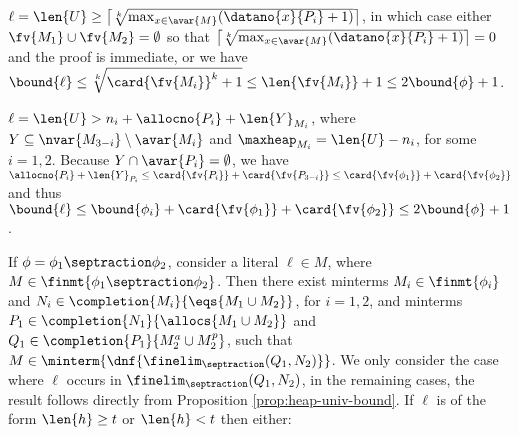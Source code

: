 {\begin{compactitem}
\begin{compactitem}
\begin{compactitem}
         \item $\ell = \len{U} \geq \left\lceil\sqrt[k]{\max_{x \in
             \avar{M}}(\datano{x}{P_i}+1)}\right\rceil$, in which case
           either $\fv{M_1} \cup \fv{M_2} = \emptyset$ so that
           $\left\lceil\sqrt[k]{\max_{x \in
               \avar{M}}(\datano{x}{P_i}+1)}\right\rceil = 0$ and the
           proof is immediate, or we have $\bound{\ell} \leq
           \sqrt[k]{\card{\fv{M_i}}^k+1} \leq \len{\fv{M_i}}+1 \leq
           2\bound{\phi} +1$.
      \end{compactitem}
    \item $\ell = \len{U} > n_i + \allocno{P_i} + \len{Y}_{M_i}$,
      where $Y \subseteq \nvar{M_{3-i}} \setminus \avar{M_i}$ and
      $\maxheap_{M_i} = \len{U} - n_i$, for some $i=1,2$. Because $Y
      \cap \avar{P_i} = \emptyset$, we have $\allocno{P_i} +
      \len{Y}_{P_i} \leq \card{\fv{P_i}} + \card{\fv{P_{3-i}}} \leq
      \card{\fv{\phi_1}} + \card{\fv{\phi_2}}$ and thus $\bound{\ell}
      \leq \bound{\phi_i} + \card{\fv{\phi_1}} + \card{\fv{\phi_2}}
      \leq 2\bound{\phi}+1$.
    \end{compactitem}
  \item If $\phi = \phi_1 \septraction \phi_2$, consider a literal
    $\ell \in M$, where $M \in \finmt{\phi_1 \septraction
    \phi_2}$. Then there exist minterms $M_i \in \finmt{\phi_i}$ and
    $N_i \in \completion{M_i}{\eqs{M_1 \cup M_2}}$, for $i=1,2$, and
    minterms $P_1 \in \completion{N_1}{\allocs{M_1 \cup M_2}}$ and
    $Q_1 \in \completion{P_1}{M_2^a \cup M_2^p}$, such that $M \in
    \minterm{\dnf{\finelim_\septraction(Q_1,N_2)}}$. We only consider
    the case where $\ell$ occurs in $\finelim_\septraction(Q_1,N_2)$,
    in the remaining cases, the result follows directly from
    Proposition \ref{prop:heap-univ-bound}. If $\ell$ is of the form
    $\len{h} \geq t$ or $\len{h} < t$ then either:
\end{compactitem}}
